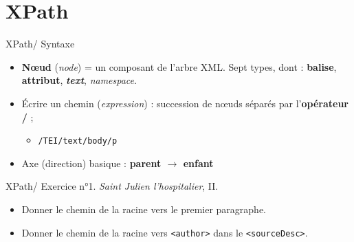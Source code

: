 \documentclass{beamer}
\begin{document}
    \section{XPath}
    
    \begin{frame}{XPath/ Syntaxe}
        \Large
        \begin{itemize}
            \item \textbf{N\oe ud} (\textit{node}) = un composant de l'arbre XML. Sept types, dont : \textbf{balise}, \textbf{attribut}, \textbf{\textit{text}}, \textit{namespace}.
            \bigskip
            \item Écrire un chemin (\textit{expression}) : succession de n\oe uds séparés par l'\textbf{opérateur /} ;
            \begin{itemize}
            \Large
                \item \texttt{/TEI/text/body/p}
            \end{itemize}
            \bigskip
            \item Axe (direction) basique : \textbf{parent $\rightarrow$ enfant}
        \end{itemize}
        
    \end{frame}
    
    \begin{frame}{XPath/ Exercice n°1. \textit{Saint Julien l'hospitalier}, II.}
        \Large
        \begin{itemize}
            \item Donner le chemin de la racine vers le premier paragraphe.
            \bigskip
            \item Donner le chemin de la racine vers \texttt{<author>} dans le \texttt{<sourceDesc>}.
        \end{itemize}
    \end{frame}
\end{document}
